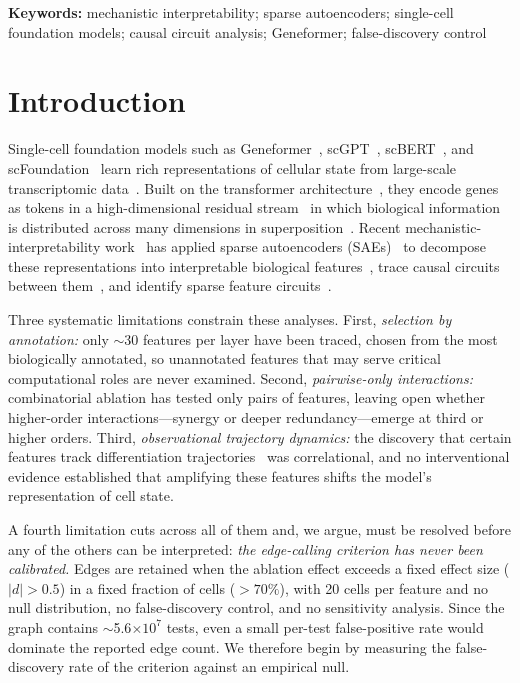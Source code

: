 \documentclass[11pt,onecolumn]{article}
\begin{document}
\noindent\textbf{Keywords:} mechanistic interpretability; sparse autoencoders; single-cell foundation models; causal circuit analysis; Geneformer; false-discovery control

\section{Introduction}
\label{sec:intro}

Single-cell foundation models such as Geneformer~\citep{theodoris2023transfer}, scGPT~\citep{cui2024scgpt}, scBERT~\citep{yang2022scbert}, and scFoundation~\citep{hao2024large} learn rich representations of cellular state from large-scale transcriptomic data~\citep{regev2017human,zheng2017massively}. Built on the transformer architecture~\citep{vaswani2017attention,devlin2019bert}, they encode genes as tokens in a high-dimensional residual stream~\citep{he2016deep,elhage2022superposition} in which biological information is distributed across many dimensions in superposition~\citep{elhage2022superposition}. Recent mechanistic-interpretability work~\citep{bereska2024mechanistic,olah2020zoom} has applied sparse autoencoders (SAEs)~\citep{cunningham2023sparse,bricken2023monosemanticity,gao2024scaling,sharkey2022taking} to decompose these representations into interpretable biological features~\citep{kendiukhov2025sae_atlas}, trace causal circuits between them~\citep{kendiukhov2025circuits}, and identify sparse feature circuits~\citep{marks2024sparse,conmy2023towards}.

Three systematic limitations constrain these analyses. First, \emph{selection by annotation:} only $\sim$30 features per layer have been traced, chosen from the most biologically annotated, so unannotated features that may serve critical computational roles are never examined. Second, \emph{pairwise-only interactions:} combinatorial ablation has tested only pairs of features, leaving open whether higher-order interactions---synergy or deeper redundancy---emerge at third or higher orders. Third, \emph{observational trajectory dynamics:} the discovery that certain features track differentiation trajectories~\citep{trapnell2014dynamics,wolf2019paga} was correlational, and no interventional evidence established that amplifying these features shifts the model's representation of cell state.

A fourth limitation cuts across all of them and, we argue, must be resolved before any of the others can be interpreted: \emph{the edge-calling criterion has never been calibrated.} Edges are retained when the ablation effect exceeds a fixed effect size ($|d|>0.5$) in a fixed fraction of cells ($>70\%$), with 20 cells per feature and no null distribution, no false-discovery control, and no sensitivity analysis. Since the graph contains $\sim$5.6$\times 10^7$ tests, even a small per-test false-positive rate would dominate the reported edge count. We therefore begin by measuring the false-discovery rate of the criterion against an empirical null.
\end{document}
